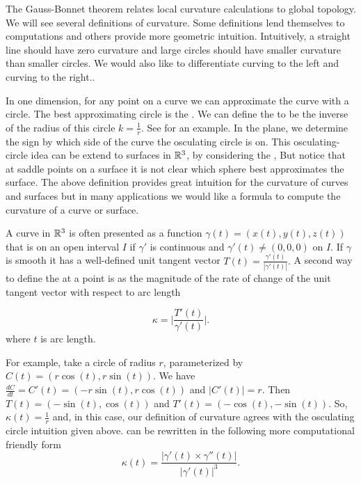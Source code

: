 
The Gauss-Bonnet theorem relates local curvature calculations
to global topology. 
We will see several definitions of curvature.
Some definitions lend themselves to computations and others provide
more geometric intuition.
Intuitively, a straight line should have zero curvature and
 large circles should have smaller curvature than smaller circles.
 We would also like to differentiate
curving to the left and curving to the right..

In one dimension, for any point on a curve
we can approximate the curve with a circle.
The best approximating circle is the  .
 We can define the  to be the inverse of the radius of this circle $k=\frac{1}{r}$.
See  for an example.
In the plane, we determine the sign by which side of the curve the osculating circle is on.
 This osculating-circle idea can be extend
to  surfaces in $\mathbb{R}^3$, by considering the ,
But notice that at saddle points on a surface it is not clear which sphere
best approximates the surface.
The above definition provides great intuition for the curvature of curves
and surfaces but in many applications we would like a formula to compute
the curvature of a curve or surface.

A curve in $\mathbb{R}^3$ is often presented as a function
$\gamma(t)=(x(t),y(t),z(t))$ that  is  on an open interval $I$
if $\gamma'$ is continuous and $\gamma'(t)\neq (0,0,0)$ on $I$. 
If $\gamma$ is smooth it has a well-defined unit tangent vector $T(t)=\frac{\gamma'(t)}{|\gamma'(t)|}.$
A second way to define the   at a point is as the magnitude of the rate of change of the unit tangent vector with respect to arc length

\begin{equation} \label{eqn:kappa}
\kappa=\bigg  | \frac{T'(t)}{\gamma'(t)}\bigg |.
\end{equation}
where $t$ is arc length.

For example, take a circle of radius $r$, parameterized by $C(t)=\left(r\cos(t),r\sin(t)\right)$.
We have $\frac{dC}{dt}=C'(t)=\left(-r\sin(t),r\cos(t)\right)$ and $|C'(t)|=r$.
Then $T(t)=\left(-\sin(t),\cos(t)\right)$ and $T'(t)=\left(-\cos(t),-\sin(t)\right)$.
So, $\kappa(t)=\frac{1}{r}$ and, in this case, our definition of curvature agrees with the
osculating circle intuition given above. 
 can be rewritten in the following more computational friendly form 
\begin{equation} \label{eqn:kappa1}
\kappa(t)=\frac{|\gamma'(t)\times \gamma''(t)|}{|\gamma'(t)|^3}.
\end{equation}

